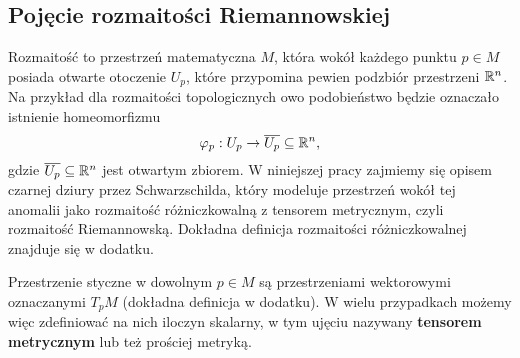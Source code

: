 \subsection{Pojęcie rozmaitości Riemannowskiej}


Rozmaitość to przestrzeń matematyczna $M$, która wokół każdego punktu $p \in M$ posiada otwarte otoczenie $U_p$, które przypomina pewien podzbiór przestrzeni $\mathbb{R}^n$. Na przykład dla rozmaitości topologicznych owo podobieństwo będzie oznaczało istnienie homeomorfizmu 
$$ \varphi_p: U_p \to \overline{U_p} \subseteq \mathbb{R}^n, $$
gdzie $\overline{U_p} \subseteq \mathbb{R}^n$ jest otwartym zbiorem. W niniejszej pracy zajmiemy się opisem czarnej dziury przez Schwarzschilda, który modeluje przestrzeń wokół tej anomalii jako rozmaitość różniczkowalną z tensorem metrycznym, czyli rozmaitość Riemannowską. Dokładna definicja rozmaitości różniczkowalnej znajduje się w {\color{red}dodatku}.



Przestrzenie styczne w dowolnym $p\in M$ są przestrzeniami wektorowymi oznaczanymi $T_pM$ (dokładna definicja w {\color{red}dodatku}). W wielu przypadkach możemy więc zdefiniować na nich iloczyn skalarny, w tym ujęciu nazywany \textbf{tensorem metrycznym} lub też prościej metryką.

